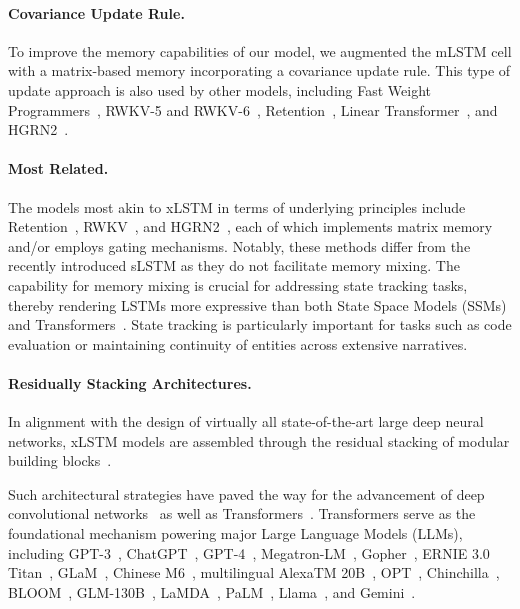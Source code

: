 \paragraph{Covariance Update Rule.} To improve the memory capabilities of our model, we augmented the mLSTM cell with a matrix-based memory incorporating a covariance update rule. This type of update approach is also used by other models, including Fast Weight Programmers~\citep{Schmidhuber:92ncfastweights,Schlag:21}, RWKV-5 and RWKV-6~\citep{Peng:24arxivshort}, Retention~\citep{Sun:23arxiv}, Linear Transformer~\citep{Katharopoulos:20}, and HGRN2~\citep{Qin:24arxiv}.

\paragraph{Most Related.} The models most akin to xLSTM in terms of underlying principles include Retention~\citep{Sun:23arxiv}, RWKV~\citep{Peng:23arxivshort,Peng:24arxivshort}, and HGRN2~\citep{Qin:24arxiv}, each of which implements matrix memory and/or employs gating mechanisms. Notably, these methods differ from the recently introduced sLSTM as they do not facilitate memory mixing. The capability for memory mixing is crucial for addressing state tracking tasks, thereby rendering LSTMs more expressive than both State Space Models (SSMs) and Transformers~\citep{Merrill:24,Deletang:23}. State tracking is particularly important for tasks such as code evaluation or maintaining continuity of entities across extensive narratives.

\paragraph{Residually Stacking Architectures.} In alignment with the design of virtually all state-of-the-art large deep neural networks, xLSTM models are assembled through the residual stacking of modular building blocks~\citep{Srivastava:15,He:16}.

Such architectural strategies have paved the way for the advancement of deep convolutional networks~\citep{He:16} as well as Transformers~\citep{Vaswani:17}. Transformers serve as the foundational mechanism powering major Large Language Models (LLMs), including GPT-3~\citep{Brown:20short}, ChatGPT~\citep{Schulman:22short}, GPT-4~\citep{Achiam:23gpt4short}, Megatron-LM~\citep{Shoeybi:19}, Gopher~\citep{Rae:21short}, ERNIE 3.0 Titan~\citep{Wang:21arxivshort}, GLaM~\citep{Du:21glamshort}, Chinese M6~\citep{Lin:21}, multilingual AlexaTM 20B~\citep{Soltan:22}, OPT~\citep{Zhang:22opt}, Chinchilla~\citep{Hoffmann:22short}, BLOOM~\citep{Scao:22arxivshort}, GLM-130B~\citep{Zeng:22arxivshort}, LaMDA~\citep{Thoppilan:22short}, PaLM~\citep{Chowdhery:22short}, Llama~\citep{Touvron:23arxiv}, and Gemini~\citep{GeminiTeam:23arxiv,Reid:24arxiv}.

